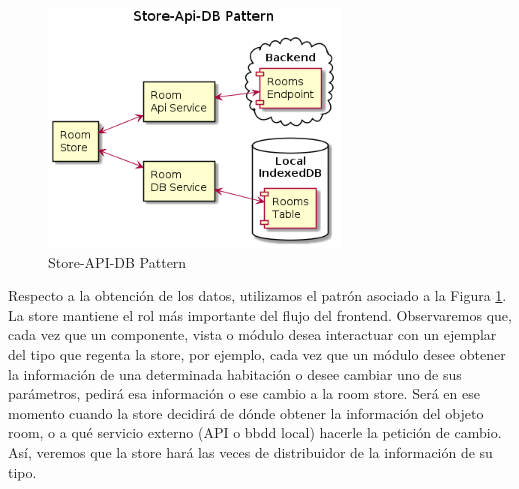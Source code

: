 \vspace{1cm}

\begin{figure}[hbt!]
\centering
\includegraphics[height=2.5in]{figures/diagrams/front/architecture/store-api-db-pattern.png}
\caption[store-api-db-pattern]{Store-API-DB Pattern\footnotemark}
\label{fig:front-store-api-db}
\end{figure}

Respecto a la obtención de los datos, utilizamos el patrón asociado a la Figura \ref{fig:front-store-api-db}. La store mantiene el rol más importante del flujo del frontend. Observaremos que, cada vez que un componente, vista o módulo desea interactuar con un ejemplar del tipo que regenta la store, por ejemplo, cada vez que un módulo desee obtener la información de una determinada habitación o desee cambiar uno de sus parámetros, pedirá esa información o ese cambio a la room store. Será en ese momento cuando la store decidirá de dónde obtener la información del objeto room, o a qué servicio externo (API o \gls{bbdd} local) hacerle la petición de cambio. Así, veremos que la store hará las veces de distribuidor de la información de su tipo.

\vspace{1cm}

